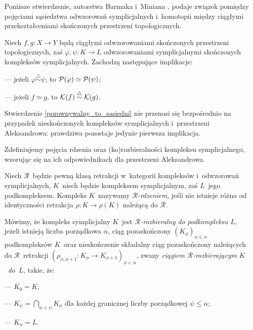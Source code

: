Poniższe stwierdzenie, autorstwa Barmaka i~Miniana \cite{Barmak12}, podaje związek pomiędzy pojęciami sąsiedztwa odwzorowań symplicjalnych i~homotopii między ciągłymi przekształceniami skończonych przestrzeni topologicznych.

\begin{stw}\label{porownywalny_to_sasiedni}
Niech $f,g\colon X\to Y$ będą ciągłymi odwzorowaniami skończonych przestrzeni topologicznych, zaś $\varphi, \psi\colon K\to L$ odwzorowaniami symplicjalnymi skończonych kompleksów symplicjalnych. Zachodzą następujące implikacje:
\begin{compactitem}
\item[---] jeżeli $\varphi\stackrel{\triangle}{\sim}\psi$, to $\mathcal{P}(\varphi)\simeq \mathcal{P}(\psi)$;
\item[---] jeżeli $f\simeq g$, to $\mathcal{K}(f)\stackrel{\triangle}{\sim} \mathcal{K}(g)$.
\end{compactitem}
\end{stw}

Stwierdzenie \ref{porownywalny_to_sasiedni} nie przenosi się bezpośrednio na przypadek nieskończonych kompleksów symplicjalnych i~przestrzeni Aleksandrowa: prawdziwa pozostaje jedynie pierwsza implikacja.

Zdefiniujemy pojęcia rdzenia oraz (ko)rozbieralności kompleksu symplicjalnego, wzorując się na ich odpowiednikach dla przestrzeni Aleksandrowa.

Niech $\mathcal{R}$~będzie pewną klasą retrakcji w~kategorii kompleksów i~odwzorowań symplicjalnych, $K$~niech będzie kompleksem symplicjalnym, zaś $L$~jego podkompleksem. Kompleks $K$~nazywamy \textit{$\mathcal{R}$-rdzeniem}, jeśli nie istnieje różna od identyczności retrakcja $\rho\colon K\to \rho(K)$ należącą do $\mathcal{R}$.

Mówimy, że kompleks symplicjalny $K$~jest \textit{$\mathcal{R}$-rozbieralny do podkompleksu $L$}, jeżeli istnieją liczba porządkowa $\alpha$, ciąg pozaskończony $\left(K_\phi\right)_{\phi\leq\alpha}$ podkompleksów $K$~oraz nieskończenie składalny ciąg  pozaskończony należących do $\mathcal{R}$~retrakcji $\left(\rho_{\phi,\phi+1}\colon K_\phi \to K_{\phi+1}\right)_{\phi<\alpha}$, zwany \textit{ciągiem $\mathcal{R}$-rozbierającym $K$~do~$L$}, takie, że:\begin{compactitem}
\item[---] $K_0=K$;
\item[---] $K_{\psi}=\bigcap_{\phi<\psi}K_{\phi}$ dla każdej granicznej liczby porządkowej $\psi\leq\alpha$;
\item[---] $K_\alpha=L$.
\end{compactitem}


